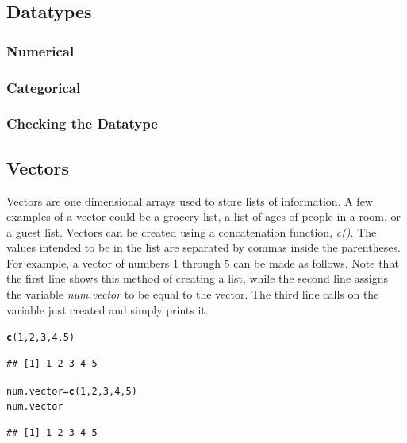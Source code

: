 \documentclass{report}\usepackage[]{graphicx}\usepackage[]{color}
\makeatletter
\newcommand{\hlnum}[1]{\textcolor[rgb]{0.686,0.059,0.569}{#1}}%
\newcommand{\hlstd}[1]{\textcolor[rgb]{0.345,0.345,0.345}{#1}}%
\newcommand{\hlkwb}[1]{\textcolor[rgb]{0.69,0.353,0.396}{#1}}%
\newcommand{\hlkwd}[1]{\textcolor[rgb]{0.737,0.353,0.396}{\textbf{#1}}}%
\newenvironment{kframe}{%
 \def\at@end@of@kframe{}%
 \ifinner\ifhmode%
  \def\at@end@of@kframe{\end{minipage}}%
  \begin{minipage}{\columnwidth}%
 \fi\fi%
 \def\FrameCommand##1{\hskip\@totalleftmargin \hskip-\fboxsep
 \colorbox{shadecolor}{##1}\hskip-\fboxsep
     \hskip-\linewidth \hskip-\@totalleftmargin \hskip\columnwidth}%
 \MakeFramed {\advance\hsize-\width
   \@totalleftmargin\z@ \linewidth\hsize
   \@setminipage}}%
 {\par\unskip\endMakeFramed%
 \at@end@of@kframe}
\newenvironment{knitrout}{}{} %
\makeatother
\begin{document}
\subsection{Datatypes}
\subsubsection{Numerical} 
\subsubsection{Categorical} 
\subsubsection{Checking the Datatype}

\subsection{Vectors} 
Vectors are one dimensional arrays used to store lists of information. A few examples of a vector could be a grocery list, a list of ages of people in a room, or a guest list.  Vectors can be created using a concatenation function, \textit{c()}.  The values intended to be in the list are separated by commas inside the parentheses.  For example, a vector of numbers 1 through 5 can be made as follows.  Note that the first line shows this method of creating a list, while the second line assigns the variable \textit{num.vector} to be equal to the vector.  The third line calls on the variable just created and simply prints it.  

\begin{knitrout}
\color{fgcolor}\begin{kframe}
\begin{alltt}
\hlkwd{c}\hlstd{(}\hlnum{1}\hlstd{,}\hlnum{2}\hlstd{,}\hlnum{3}\hlstd{,}\hlnum{4}\hlstd{,}\hlnum{5}\hlstd{)}
\end{alltt}
\begin{verbatim}
## [1] 1 2 3 4 5
\end{verbatim}
\begin{alltt}
\hlstd{num.vector} \hlkwb{=} \hlkwd{c}\hlstd{(}\hlnum{1}\hlstd{,}\hlnum{2}\hlstd{,}\hlnum{3}\hlstd{,}\hlnum{4}\hlstd{,}\hlnum{5}\hlstd{)}
\hlstd{num.vector}
\end{alltt}
\begin{verbatim}
## [1] 1 2 3 4 5
\end{verbatim}
\end{kframe}
\end{knitrout}
\end{document}
